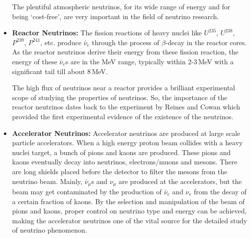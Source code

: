 \begin{itemize}
  The plentiful atmospheric neutrinos, for its wide range of energy
  and for being `cost-free', are very important in the field of
  neutrino research.
  
\item \textbf{Reactor Neutrinos:} The fission reactions of heavy
  nuclei like $U^{235}$, $U^{238}$, $P^{239}$, $P^{241}$, etc. produce
  $\bar{\nu}_{e}$ through the process of $\beta$-decay in the reactor
  cores. As the reactor neutrinos derive their energy from these
  fission reaction, the energy of these $\bar{\nu}_{e}$s are in the
  MeV range, typically within 2-3\,MeV with a significant tail till
  about 8\,MeV.

  The high flux of neutrinos near a reactor provides a brilliant
  experimental scope of studying the properties of neutrinos. So, the
  importance of the reactor neutrinos dates back to the experiment by
  Reines and Cowan which provided the first experimental evidence of
  the existence of the neutrinos.
  
\item \textbf{Accelerator Neutrinos:} Accelerator neutrinos are
  produced at large scale particle accelerators. When a high energy
  proton beam collides with a heavy nuclei target, a bunch of pions
  and kaons are produced. These pions and kaons eventually decay into
  neutrinos, electrons/muons and mesons. There are long shields placed before the
  detector to filter the mesons from the neutrino beam. Mainly,
  $\bar{\nu}_{\mu}$s and $\nu_{\mu}$ are produced at the accelerators,
  but the beam may get contaminated by the production of
  $\bar{\nu}_{e}$ and $\nu_{e}$ from the decay of a certain fraction
  of kaons. By the selection and manipulation of the beam of pions and
  kaons, proper control on neutrino type and energy can be achieved,
  making the accelerator neutrinos one of the vital source for the
  detailed study of neutrino phenomenon.
  
\end{itemize}


